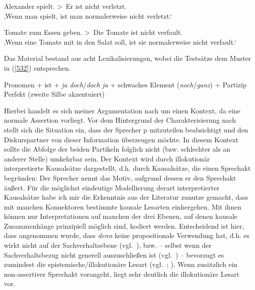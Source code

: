 \begin{exe}
	\ex\label{530}
	Alexander spielt. \textgreater\ Er ist nicht verletzt.\\
	‚Wenn man spielt, ist man normalerweise nicht verletzt.‘ 
\end{exe}		
		
\begin{exe}
	\ex\label{531}
	Tomate zum Essen geben. \textgreater\ Die Tomate ist nicht verfault.\\
	‚Wenn eine Tomate mit in den Salat soll, ist sie normalerweise nicht verfault.‘ 
\end{exe}
Das Material bestand aus acht Lexikalisierungen, wobei die Testsätze dem Muster in (\ref{532}) entsprechen.

\begin{exe}
	\ex\label{532}
	Pronomen + ist + \textit{ja doch}/\textit{doch ja} + schwaches Element (\textit{noch}/\textit{ganz}) + 			Partizip Perfekt (zweite Silbe akzentuiert)
\end{exe}
Hierbei handelt es sich meiner Argumentation nach um einen   Kontext, da eine normale Assertion vorliegt. Vor dem Hintergrund der Charakterisie\-rung nach \citet{Farkas2010} stellt sich die Situation ein, dass der Sprecher p mitzuteilen beabsichtigt und den Diskurspartner von dieser Information über\-zeugen möchte. In diesem Kontext sollte die Abfolge der beiden Partikeln folglich nicht (bzw. schlechter als an anderer Stelle) umkehrbar sein. Der   Kontext wird durch illokutionär interpretierte Kausalsätze  dargestellt, d.h. durch Kausalsätze, die einen Sprechakt  begründen: Der Sprecher nennt das Motiv, aufgrund dessen er den Sprechakt äußert. Für die möglichst eindeutige Modellierung derart interpretierter Kausalsätze habe ich mir die Erkenntnis aus der Literatur zunutze gemacht, dass mit manchen Konnektoren bestimmte kausale Lesarten einhergehen. Mit ihnen können nur Interpretationen auf manchen der drei Ebenen, auf denen kausale Zusammenhänge prinzipiell möglich sind, kodiert werden. Entscheidend ist hier, dass angenommen wurde, dass \textit{denn} keine propositionale Verwendung hat, d.h. es wirkt nicht auf der Sachverhaltsebene (vgl.\ \citealt[320]{Volodina2010}), bzw. – selbst wenn der Sachverhaltsbezug nicht generell auszuschließen ist (vgl.\ \citealt[141]{Schmidhauser1995}) – bevorzugt es zumindest  die  epistemische/illokutionäre Lesart (vgl.\ \citealt[270]{Bluehdorn2006}; \citeyear[29]{Bluehdorn2008}). Wenn zusätzlich ein non-assertiver Sprechakt vorangeht, liegt sehr deutlich die illokutionäre Lesart vor.

